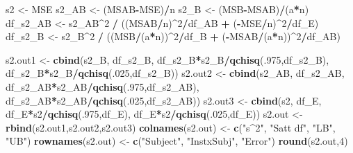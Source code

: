 \documentclass[
]{book}
\newenvironment{Shaded}{\begin{snugshade}}{\end{snugshade}}
\newcommand{\DecValTok}[1]{\textcolor[rgb]{0.00,0.00,0.81}{#1}}
\newcommand{\FunctionTok}[1]{\textcolor[rgb]{0.13,0.29,0.53}{\textbf{#1}}}
\newcommand{\NormalTok}[1]{#1}
\newcommand{\OtherTok}[1]{\textcolor[rgb]{0.56,0.35,0.01}{#1}}
\newcommand{\SpecialCharTok}[1]{\textcolor[rgb]{0.81,0.36,0.00}{\textbf{#1}}}
\newcommand{\StringTok}[1]{\textcolor[rgb]{0.31,0.60,0.02}{#1}}
\begin{document}
\begin{Shaded}
\begin{Highlighting}[]
\NormalTok{s2 }\OtherTok{\textless{}{-}}\NormalTok{ MSE}
\NormalTok{s2\_AB }\OtherTok{\textless{}{-}}\NormalTok{ (MSAB}\SpecialCharTok{{-}}\NormalTok{MSE)}\SpecialCharTok{/}\NormalTok{n}
\NormalTok{s2\_B }\OtherTok{\textless{}{-}}\NormalTok{ (MSB}\SpecialCharTok{{-}}\NormalTok{MSAB)}\SpecialCharTok{/}\NormalTok{(a}\SpecialCharTok{*}\NormalTok{n)}
\NormalTok{df\_s2\_AB }\OtherTok{\textless{}{-}}\NormalTok{ s2\_AB}\SpecialCharTok{\^{}}\DecValTok{2} \SpecialCharTok{/}\NormalTok{ ((MSAB}\SpecialCharTok{/}\NormalTok{n)}\SpecialCharTok{\^{}}\DecValTok{2}\SpecialCharTok{/}\NormalTok{df\_AB }\SpecialCharTok{+}\NormalTok{ (}\SpecialCharTok{{-}}\NormalTok{MSE}\SpecialCharTok{/}\NormalTok{n)}\SpecialCharTok{\^{}}\DecValTok{2}\SpecialCharTok{/}\NormalTok{df\_E)}
\NormalTok{df\_s2\_B }\OtherTok{\textless{}{-}}\NormalTok{ s2\_B}\SpecialCharTok{\^{}}\DecValTok{2} \SpecialCharTok{/}\NormalTok{ ((MSB}\SpecialCharTok{/}\NormalTok{(a}\SpecialCharTok{*}\NormalTok{n))}\SpecialCharTok{\^{}}\DecValTok{2}\SpecialCharTok{/}\NormalTok{df\_B }\SpecialCharTok{+}\NormalTok{ (}\SpecialCharTok{{-}}\NormalTok{MSAB}\SpecialCharTok{/}\NormalTok{(a}\SpecialCharTok{*}\NormalTok{n))}\SpecialCharTok{\^{}}\DecValTok{2}\SpecialCharTok{/}\NormalTok{df\_AB)}

\NormalTok{s2.out1 }\OtherTok{\textless{}{-}} \FunctionTok{cbind}\NormalTok{(s2\_B, df\_s2\_B, df\_s2\_B}\SpecialCharTok{*}\NormalTok{s2\_B}\SpecialCharTok{/}\FunctionTok{qchisq}\NormalTok{(.}\DecValTok{975}\NormalTok{,df\_s2\_B), }
\NormalTok{                 df\_s2\_B}\SpecialCharTok{*}\NormalTok{s2\_B}\SpecialCharTok{/}\FunctionTok{qchisq}\NormalTok{(.}\DecValTok{025}\NormalTok{,df\_s2\_B))}
\NormalTok{s2.out2 }\OtherTok{\textless{}{-}} \FunctionTok{cbind}\NormalTok{(s2\_AB, df\_s2\_AB, df\_s2\_AB}\SpecialCharTok{*}\NormalTok{s2\_AB}\SpecialCharTok{/}\FunctionTok{qchisq}\NormalTok{(.}\DecValTok{975}\NormalTok{,df\_s2\_AB), }
\NormalTok{                 df\_s2\_AB}\SpecialCharTok{*}\NormalTok{s2\_AB}\SpecialCharTok{/}\FunctionTok{qchisq}\NormalTok{(.}\DecValTok{025}\NormalTok{,df\_s2\_AB))}
\NormalTok{s2.out3 }\OtherTok{\textless{}{-}} \FunctionTok{cbind}\NormalTok{(s2, df\_E, df\_E}\SpecialCharTok{*}\NormalTok{s2}\SpecialCharTok{/}\FunctionTok{qchisq}\NormalTok{(.}\DecValTok{975}\NormalTok{,df\_E), }
\NormalTok{                 df\_E}\SpecialCharTok{*}\NormalTok{s2}\SpecialCharTok{/}\FunctionTok{qchisq}\NormalTok{(.}\DecValTok{025}\NormalTok{,df\_E))}
\NormalTok{s2.out }\OtherTok{\textless{}{-}} \FunctionTok{rbind}\NormalTok{(s2.out1,s2.out2,s2.out3)}
\FunctionTok{colnames}\NormalTok{(s2.out) }\OtherTok{\textless{}{-}} \FunctionTok{c}\NormalTok{(}\StringTok{"s\^{}2"}\NormalTok{, }\StringTok{"Satt df"}\NormalTok{, }\StringTok{"LB"}\NormalTok{, }\StringTok{"UB"}\NormalTok{)}
\FunctionTok{rownames}\NormalTok{(s2.out) }\OtherTok{\textless{}{-}} \FunctionTok{c}\NormalTok{(}\StringTok{"Subject"}\NormalTok{, }\StringTok{"InstxSubj"}\NormalTok{, }\StringTok{"Error"}\NormalTok{)}
\FunctionTok{round}\NormalTok{(s2.out,}\DecValTok{4}\NormalTok{)}
\end{Highlighting}
\end{Shaded}
\end{document}
